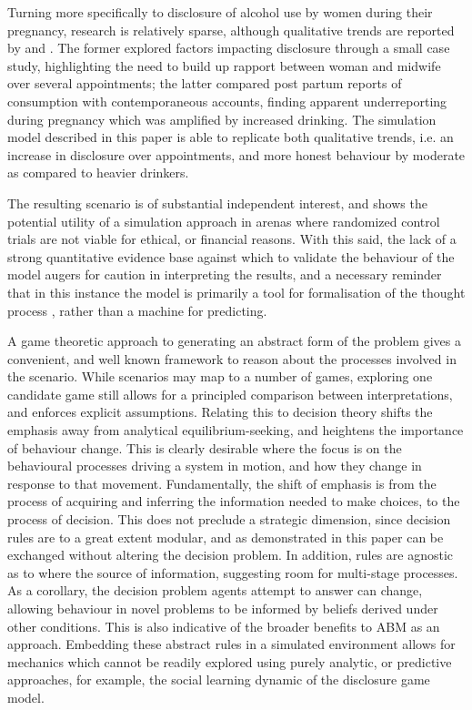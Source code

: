 Turning more specifically to disclosure of alcohol use by women during their pregnancy, research is relatively sparse, although qualitative trends are reported by \citet{Phillips2007} and \citet{Alvik2006}. The former explored factors impacting disclosure through a small case study, highlighting the need to build up rapport between woman and midwife over several appointments; the latter compared post partum reports of consumption with contemporaneous accounts, finding apparent underreporting during pregnancy which was amplified by increased drinking. The simulation model described in this paper is able to replicate both qualitative trends, i.e. an increase in disclosure over appointments, and more honest behaviour by moderate as compared to heavier drinkers.

The resulting scenario is of substantial independent interest, and shows the potential utility of a simulation approach in arenas where randomized control trials are not viable for ethical, or financial reasons. With this said, the lack of a strong quantitative evidence base against which to validate the behaviour of the model augers for caution in interpreting the results, and a necessary reminder that in this instance the model is primarily a tool for formalisation of the thought process \citep{epstein2008}, rather than a machine for predicting.


A game theoretic approach to generating an abstract form of the problem gives a convenient, and well known framework to reason about the processes involved in the scenario. While scenarios may map to a number of games, exploring one candidate game still allows for a principled comparison between interpretations, and enforces explicit assumptions. Relating this to decision theory shifts the emphasis away from analytical equilibrium-seeking, and heightens the importance of behaviour change. This is clearly desirable where the focus is on the behavioural processes driving a system in motion, and how they change in response to that movement.
Fundamentally, the shift of emphasis is from the process of acquiring and inferring the information needed to make choices, to the process of decision.
This does not preclude a strategic dimension, since decision rules are to a great extent modular, and as demonstrated in this paper can be exchanged without altering the decision problem. In addition, rules are agnostic as to where the source of information, suggesting room for multi-stage processes.  As a corollary, the decision problem agents attempt to answer can change, allowing behaviour in novel problems to be informed by beliefs derived under other conditions. This is also indicative of the broader benefits to \ac{ABM} as an approach. Embedding these abstract rules in a simulated environment allows for mechanics which cannot be readily explored using purely analytic, or predictive approaches, for example, the social learning dynamic of the disclosure game model.

